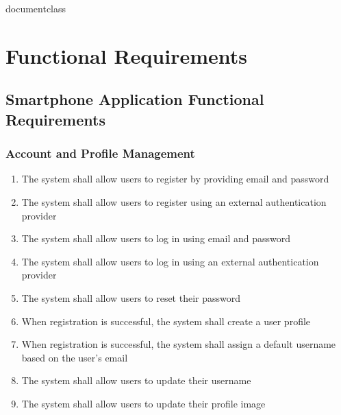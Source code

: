 \csname documentclass






\chapter{Functional Requirements} 
\label{Functional Requirements}
\section{Smartphone Application Functional Requirements}
\subsection{Account and Profile Management}
\begin{enumerate}[label=\textbf{FR\arabic*}, ref=FR\arabic*]

\item \label{fr-smartphone:register-email}
The system shall allow users to register by providing email and password


\item \label{fr-smartphone:register-external}
The system shall allow users to register using an external authentication provider

\item \label{fr-smartphone:login-email}
The system shall allow users to log in using email and password

\item \label{fr-smartphone:login-external}
The system shall allow users to log in using an external authentication provider

\item \label{fr-smartphone:reset-password}
The system shall allow users to reset their password

\item \label{fr-smartphone:create-profile}
When registration is successful, the system shall create a user profile

\item \label{fr-smartphone:default-username}
When registration is successful, the system shall assign a default username based on the user’s email

\item \label{fr-smartphone:update-username}
The system shall allow users to update their username

\item \label{fr-smartphone:update-image}
The system shall allow users to update their profile image


\end{enumerate}
